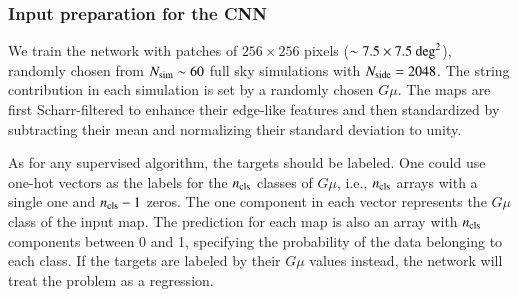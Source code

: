 \documentclass[fleqn,usenatbib]{mnras}
\begin{document}
\subsubsection{Input preparation for the CNN}
We train the network with patches of $256\times 256$ pixels  ($\sim7.5\times7.5 ~  \rm{deg}^2$),  randomly chosen  from $N_{\rm sim}\sim 60$ full sky simulations with $N_{\rm side}=2048$. The string contribution in each simulation is set by a randomly chosen $G\mu$. The maps are first Scharr-filtered to enhance their edge-like features and then standardized by subtracting their mean and normalizing their standard deviation to unity. 

As for any supervised algorithm, the targets should be labeled. One could use one-hot vectors as the labels for the $n_{\rm cls}$ classes of $G\mu$, i.e., $n_{\rm cls}$ arrays with a single one and $n_{\rm cls}-1$ zeros.
% 
 The one component in each vector represents the $G\mu$ class of the input map. 
 The  prediction for each map is also an array with 
 $n_{\rm cls}$  components between 0 and 1, specifying the probability of the data  belonging to each class.  If the targets are labeled  by their $G\mu$ values instead, the network will treat the problem as a regression. 
 
\end{document}
